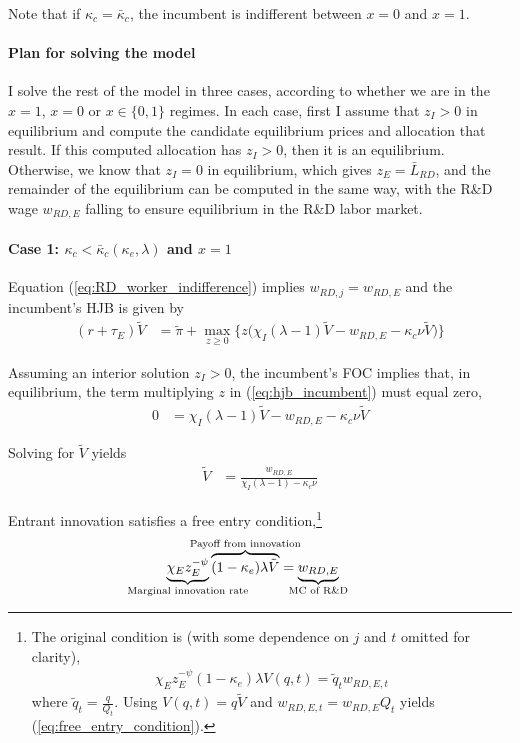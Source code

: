 \documentclass[11pt,english]{article}
\theoremstyle{remark}
\begin{document}
Note that if $\kappa_c = \bar{\kappa}_c$, the incumbent is indifferent between $x = 0$ and $x = 1$.

\paragraph{Plan for solving the model}

I solve the rest of the model in three cases, according to whether we are in the $x = 1$, $x = 0$ or $x \in \{0,1\}$ regimes. In each case, first I assume that $z_I > 0$ in equilibrium and compute the candidate equilibrium prices and allocation that result. If this computed allocation has $z_I > 0$, then it is an equilibrium. Otherwise, we know that $z_I = 0$ in equilibrium, which gives $z_E = \bar{L}_{RD}$, and the remainder of the equilibrium can be computed in the same way, with the R\&D wage $w_{RD,E}$ falling to ensure equilibrium in the R\&D labor market. 

\paragraph{Case 1: $\kappa_c < \bar{\kappa}_c(\kappa_e,\lambda)$ and $x = 1$}

Equation (\ref{eq:RD_worker_indifference}) implies $w_{RD,j} = w_{RD,E}$ and the incumbent's HJB is given by 
\begin{align}
(r + \tau_E) \tilde{V} &= \tilde{\pi} + \max_{z \ge 0} \Big\{z \big(\chi_I (\lambda - 1) \tilde{V} - w_{RD,E} - \kappa_{c} \nu \tilde{V}\big) \Big\} \label{eq:hjb_incumbent}
\end{align}

Assuming an interior solution $z_I > 0$, the incumbent's FOC implies that, in equilibrium, the term multiplying $z$ in (\ref{eq:hjb_incumbent}) must equal zero,
\begin{align*}
	0 &= \chi_I(\lambda-1)\tilde{V}- w_{RD,E} - \kappa_c \nu \tilde{V}
\end{align*}

Solving for $\tilde{V}$ yields
\begin{align}
	\tilde{V} &= \frac{w_{RD,E}}{\chi_I(\lambda - 1) - \kappa_{c} \nu} \label{eq:hjb_incumbent_foc}
\end{align}

Entrant innovation satisfies a free entry condition,\footnote{The original condition is (with some dependence on $j$ and $t$ omitted for clarity), 
	\begin{align*}
		\chi_E z_E^{-\psi} (1-\kappa_e) \lambda V(q,t) = \tilde{q}_t w_{RD,E,t}
	\end{align*}
	where $\tilde{q}_t = \frac{q}{Q_t}$. Using $V(q,t) = q \tilde{V}$ and $w_{RD,E,t} = w_{RD,E} Q_t$ yields (\ref{eq:free_entry_condition}).}
\begin{align}
	\underbrace{\chi_E z_E^{-\psi}}_{\mathclap{\text{Marginal innovation rate}}} \overbrace{(1-\kappa_e) \lambda \tilde{V}}^{\mathclap{\text{Payoff from innovation}}} &= \underbrace{w_{RD,E}}_{\mathclap{\text{MC of R\&D}}} \label{eq:free_entry_condition}
\end{align}
\end{document}
